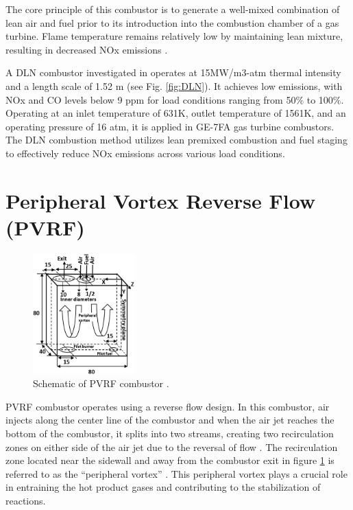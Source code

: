 The core principle of this combustor is to generate a well-mixed combination of lean air and fuel prior to its introduction into the combustion chamber of a gas turbine\cite{VAThesis2011}. Flame temperature remains relatively low by maintaining lean mixture, resulting in decreased NOx emissions \cite{SKG2017}. 

A DLN combustor investigated in \cite{Vandervort1362661} operates at 15MW/m3-atm thermal intensity and a length scale of 1.52 m (see Fig. \ref{fig:DLN}). It achieves low emissions, with NOx and CO levels below 9 ppm for load conditions ranging from 50$\%$ to 100$\%$. Operating at an inlet temperature of 631K, outlet temperature of 1561K, and an operating pressure of 16 atm, it is applied in GE-7FA gas turbine combustors. The DLN combustion method utilizes lean premixed combustion and fuel staging to effectively reduce NOx emissions across various load conditions.

\section{Peripheral Vortex Reverse Flow (PVRF)}

\begin{figure}
\vspace{-5mm}
    \centering
    \includegraphics[width=0.35\textwidth]{Chapter2/Images/PVRF.jpg}
    \caption[Schematic of PVRF combustor]{Schematic of PVRF combustor \cite{AHMAD2023101200}.}
    \label{fig:Ch2PVRF}
\end{figure}

PVRF combustor operates using a reverse flow design. In this combustor, air injects along the center line of the combustor and when the air jet reaches the bottom of the combustor, it splits into two streams, creating two recirculation zones on either side of the air jet due to the reversal of flow \cite{AHMAD2021100754}. The recirculation zone located near the sidewall and away from the combustor exit in figure \ref{fig:Ch2PVRF} is referred to as the ``peripheral vortex'' \cite{AHMAD2021100754}. This peripheral vortex plays a crucial role in entraining the hot product gases and contributing to the stabilization of reactions.

